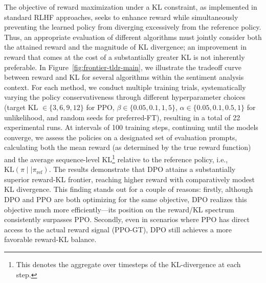 The objective of reward maximization under a KL constraint, as implemented in standard RLHF approaches, seeks to enhance reward while simultaneously preventing the learned policy from diverging excessively from the reference policy. Thus, an appropriate evaluation of different algorithms must jointly consider both the attained reward and the magnitude of KL divergence; an improvement in reward that comes at the cost of a substantially greater KL is not inherently preferable. In Figure~\ref{fig:frontier-tldr-main}, we illustrate the tradeoff curve between reward and KL for several algorithms within the sentiment analysis context. For each method, we conduct multiple training trials, systematically varying the policy conservativeness through different hyperparameter choices (target KL $\in\{3,6,9,12\}$ for PPO, $\beta \in \{0.05,0.1,1,5\}$, $\alpha\in\{0.05,0.1,0.5,1\}$ for unlikelihood, and random seeds for preferred-FT), resulting in a total of 22 experimental runs. At intervals of 100 training steps, continuing until the models converge, we assess the policies on a designated set of evaluation prompts, calculating both the mean reward (as determined by the true reward function) and the average sequence-level KL\footnote{This denotes the aggregate over timesteps of the KL-divergence at each step.} relative to the reference policy, i.e., $\text{KL}\left(\pi\mid \mid \pi_\text{ref}\right)$. The results demonstrate that DPO attains a substantially superior reward-KL frontier, reaching higher reward with comparatively modest KL divergence. This finding stands out for a couple of reasons: firstly, although DPO and PPO are both optimizing for the same objective, DPO realizes this objective much more efficiently—its position on the reward/KL spectrum consistently surpasses PPO. Secondly, even in scenarios where PPO has direct access to the actual reward signal (PPO-GT), DPO still achieves a more favorable reward-KL balance.

